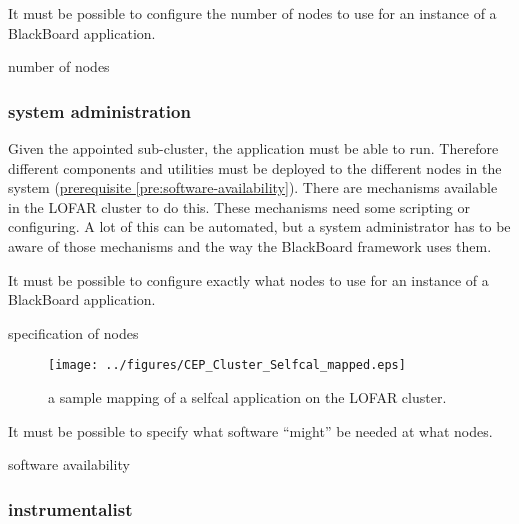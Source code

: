 \documentclass[]{lofar}
\begin{document}
        \begin{requirement}
          It must be possible to configure the number of nodes to use
          for an instance of a BlackBoard application.
          \caption{number of nodes\label{req:number-of-nodes}}
        \end{requirement}

      \subsubsection{system administration}

        Given the appointed sub-cluster, the application must be able
        to run. Therefore different components and utilities must be
        deployed to the different nodes in the system
        (\hyperlink{pre:software-availability}{prerequisite \ref{pre:software-availability}}). There are
        mechanisms available in the LOFAR cluster to do this. These
        mechanisms need some scripting or configuring. A lot of this
        can be automated, but a system administrator has to be aware
        of those mechanisms and the way the BlackBoard framework uses
        them.

        \begin{requirement}
          It must be possible to configure exactly what nodes to use
          for an instance of a BlackBoard application.
          \caption{specification of nodes\label{req:specification-of-nodes}}
        \end{requirement}

        \begin{figure}
          \texttt{[image: ../figures/CEP\_Cluster\_Selfcal\_mapped.eps]}
          \hypertarget{fig:selfcalMapped}{}
          \caption{a sample mapping of a selfcal application on the
          LOFAR cluster.\label{fig:selfcalMapped}}
        \end{figure}

        \begin{prerequisite}
          It must be possible to specify what software ``might'' be
          needed at what nodes.
          \caption{software availability\label{pre:software-availability}}
        \end{prerequisite}

      \subsubsection{instrumentalist}
\end{document}
